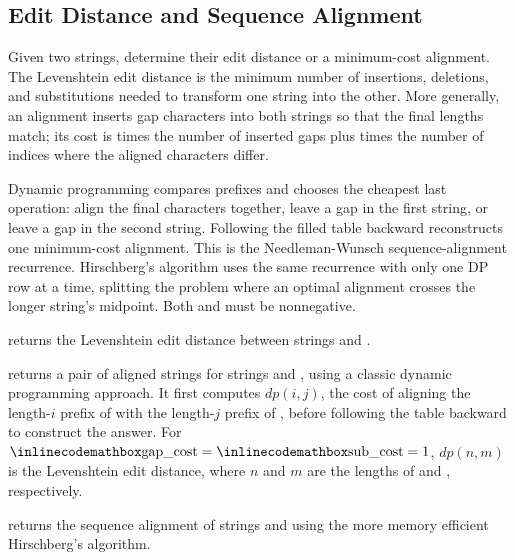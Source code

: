 \subsection{Edit Distance and Sequence Alignment}
\label{sec:3.6.3}
Given two strings, determine their edit distance or a minimum-cost alignment. The Levenshtein edit distance is the minimum number of insertions, deletions, and substitutions needed to transform one string into the other. More generally, an alignment inserts gap characters \inlinecode{\textquotesingle{}\_\textquotesingle{}} into both strings so that the final lengths match; its cost is  times the number of inserted gaps plus  times the number of indices where the aligned characters differ.

Dynamic programming compares prefixes and chooses the cheapest last operation: align the final characters together, leave a gap in the first string, or leave a gap in the second string. Following the filled table backward reconstructs one minimum-cost alignment. This is the Needleman-Wunsch sequence-alignment recurrence. Hirschberg's algorithm uses the same recurrence with only one DP row at a time, splitting the problem where an optimal alignment crosses the longer string's midpoint. Both  and  must be nonnegative.

\begin{compactitem}
  \item {} returns the Levenshtein edit distance between strings  and .
  \item {} returns a pair of aligned strings for strings  and , using a classic dynamic programming approach. It first computes $dp(i, j)$, the cost of aligning the length-$i$ prefix of  with the length-$j$ prefix of , before following the table backward to construct the answer. For ${\inlinecodemath{gap\_cost}} = {\inlinecodemath{sub\_cost}} = 1$, $dp(n, m)$ is the Levenshtein edit distance, where $n$ and $m$ are the lengths of  and , respectively.
  \item {} returns the sequence alignment of strings  and  using the more memory efficient Hirschberg's algorithm.
\end{compactitem}


